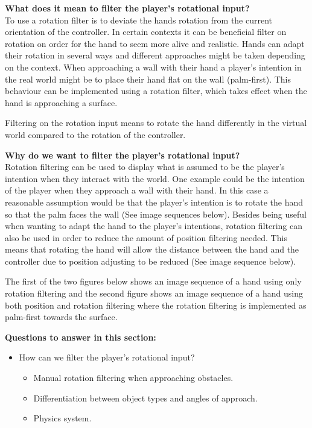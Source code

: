 \textbf{What does it mean to filter the player's rotational input?}\\
To use a rotation filter is to deviate the hands rotation from the current orientation of the controller. In certain contexts it can be beneficial filter on rotation on order for the hand to seem more alive and realistic. Hands can adapt their rotation in several ways and different approaches might be taken depending on the context. When approaching a wall with their hand a player's intention in the real world might be to place their hand flat on the wall (palm-first). This behaviour can be implemented using a rotation filter, which takes effect when the hand is approaching a surface.


 Filtering on the rotation input means to rotate the hand differently in the virtual world compared to the rotation of the controller.

\textbf{Why do we want to filter the player's rotational input?}\\
Rotation filtering can be used to display what is assumed to be the player's intention when they interact with the world. One example could be the intention of the player when they approach a wall with their hand. In this case a reasonable assumption would be that the player's intention is to rotate the hand so that the palm faces the wall (See image sequences below). Besides being useful when wanting to adapt the hand to the player's intentions, rotation filtering can also be used in order to reduce the amount of position filtering needed. This means that rotating the hand will allow the distance between the hand and the controller due to position adjusting to be reduced (See image sequence below).

The first of the two figures below shows an image sequence of a hand using only rotation filtering and the second figure shows an image sequence of a hand using both position and rotation filtering where the rotation filtering is implemented as palm-first towards the surface.


\textbf{Questions to answer in this section:}
\begin{itemize}
\item How can we filter the player's rotational input?
\begin{itemize}
\item Manual rotation filtering when approaching obstacles.
\item Differentiation between object types and angles of approach.
\item Physics system.
\end{itemize}
\end{itemize}

